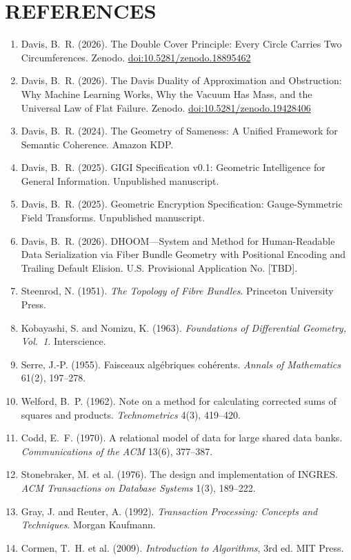 \documentclass[11pt,letterpaper]{article}
\begin{document}
\newpage
\section*{REFERENCES}

\begin{enumerate}[nosep]
  \item Davis, B.~R. (2026). The Double Cover Principle: Every Circle Carries Two Circumferences. Zenodo. \href{https://doi.org/10.5281/zenodo.18895462}{doi:10.5281/zenodo.18895462}
  \item Davis, B.~R. (2026). The Davis Duality of Approximation and Obstruction: Why Machine Learning Works, Why the Vacuum Has Mass, and the Universal Law of Flat Failure. Zenodo. \href{https://doi.org/10.5281/zenodo.19428406}{doi:10.5281/zenodo.19428406}
  \item Davis, B.~R. (2024). The Geometry of Sameness: A Unified Framework for Semantic Coherence. Amazon KDP.
  \item Davis, B.~R. (2025). GIGI Specification v0.1: Geometric Intelligence for General Information. Unpublished manuscript.
  \item Davis, B.~R. (2025). Geometric Encryption Specification: Gauge-Symmetric Field Transforms. Unpublished manuscript.
  \item Davis, B.~R. (2026). DHOOM---System and Method for Human-Readable Data Serialization via Fiber Bundle Geometry with Positional Encoding and Trailing Default Elision. U.S. Provisional Application No. [TBD].
  \item Steenrod, N. (1951). \emph{The Topology of Fibre Bundles}. Princeton University Press.
  \item Kobayashi, S. and Nomizu, K. (1963). \emph{Foundations of Differential Geometry, Vol.~1}. Interscience.
  \item Serre, J.-P. (1955). Faisceaux alg\'ebriques coh\'erents. \emph{Annals of Mathematics} 61(2), 197--278.
  \item Welford, B.~P. (1962). Note on a method for calculating corrected sums of squares and products. \emph{Technometrics} 4(3), 419--420.
  \item Codd, E.~F. (1970). A relational model of data for large shared data banks. \emph{Communications of the ACM} 13(6), 377--387.
  \item Stonebraker, M. et al. (1976). The design and implementation of INGRES. \emph{ACM Transactions on Database Systems} 1(3), 189--222.
  \item Gray, J. and Reuter, A. (1992). \emph{Transaction Processing: Concepts and Techniques}. Morgan Kaufmann.
  \item Cormen, T.~H. et al. (2009). \emph{Introduction to Algorithms}, 3rd ed. MIT Press.
\end{enumerate}
\end{document}
